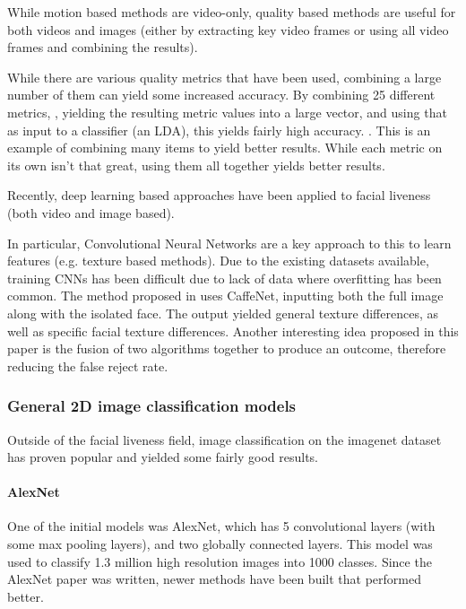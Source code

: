 \documentclass[10pt,a4paper]{article}
\begin{document}
        While motion based methods are video-only, quality based methods are useful for both videos and images (either by extracting key video frames or using all video frames and combining the results).

        While there are various quality metrics that have been used, combining a large number of them can yield some increased accuracy. By combining 25 different metrics,
        , yielding the resulting metric values into a large vector, and using that as input to a classifier (an LDA), this yields fairly high accuracy. \cite{ImageQualityAssessmentTest}.
        This is an example of combining many items to yield better results. While each metric on its own isn't that great, using them all together yields better results.
        
        Recently, deep learning based approaches have been applied to facial liveness (both video and image based).

        In particular, Convolutional Neural Networks are a key approach to this to learn features (e.g. texture based methods).
        Due to the existing datasets available, training CNNs has been difficult due to lack of data where overfitting has been common.
        The method proposed in \cite{Patel2016CrossDatabaseFA} uses CaffeNet, inputting both the full image along with the isolated face.
        The output yielded general texture differences, as well as specific facial texture differences. Another interesting idea proposed
        in this paper is the fusion of two algorithms together to produce an outcome, therefore reducing the false reject rate.
        
        \subsubsection{General 2D image classification models}
        Outside of the facial liveness field, image classification on the imagenet dataset has proven popular and yielded some fairly good
        results. 
        
        \paragraph{AlexNet} 
        One of the initial models was AlexNet, which has 5 convolutional layers (with some max pooling layers), and two globally connected layers.
        This model was used to classify 1.3 million high resolution images into 1000 classes. \cite{AlexNet} Since the AlexNet paper was written,
        newer methods have been built that performed better. 
        
\end{document}
